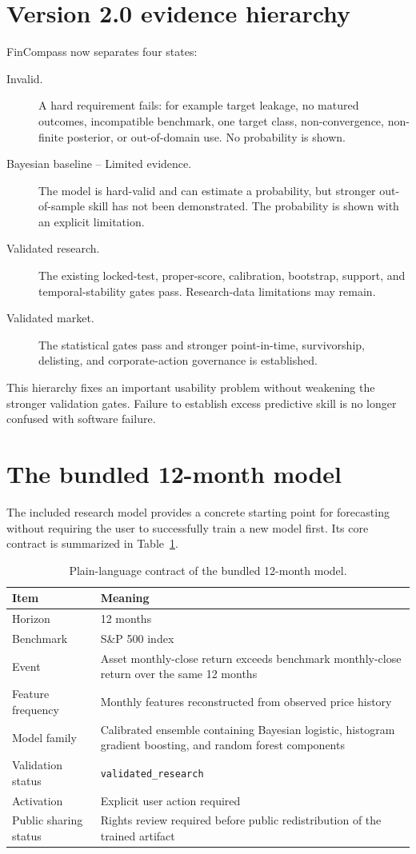 \documentclass[11pt]{article}
\begin{document}
\section{Version 2.0 evidence hierarchy}
FinCompass now separates four states:
\begin{description}
\item[Invalid.] A hard requirement fails: for example target leakage, no matured outcomes, incompatible benchmark, one target class, non-convergence, non-finite posterior, or out-of-domain use. No probability is shown.
\item[Bayesian baseline -- Limited evidence.] The model is hard-valid and can estimate a probability, but stronger out-of-sample skill has not been demonstrated. The probability is shown with an explicit limitation.
\item[Validated research.] The existing locked-test, proper-score, calibration, bootstrap, support, and temporal-stability gates pass. Research-data limitations may remain.
\item[Validated market.] The statistical gates pass and stronger point-in-time, survivorship, delisting, and corporate-action governance is established.
\end{description}
This hierarchy fixes an important usability problem without weakening the stronger validation gates. Failure to establish excess predictive skill is no longer confused with software failure.

\section{The bundled 12-month model}

The included research model provides a concrete starting point for forecasting without requiring the user to successfully train a new model first. Its core contract is summarized in Table~\ref{tab:bundledplain}.

\begin{table}[H]
\centering
\small
\caption{Plain-language contract of the bundled 12-month model.}
\label{tab:bundledplain}
\begin{tabularx}{\textwidth}{@{}p{}X@{}}
\toprule
Item & Meaning \\
\midrule
Horizon & 12 months \\
Benchmark & S\&P 500 index \\
Event & Asset monthly-close return exceeds benchmark monthly-close return over the same 12 months \\
Feature frequency & Monthly features reconstructed from observed price history \\
Model family & Calibrated ensemble containing Bayesian logistic, histogram gradient boosting, and random forest components \\
Validation status & \texttt{validated\_research} \\
Activation & Explicit user action required \\
Public sharing status & Rights review required before public redistribution of the trained artifact \\
\bottomrule
\end{tabularx}
\end{table}
\end{document}
